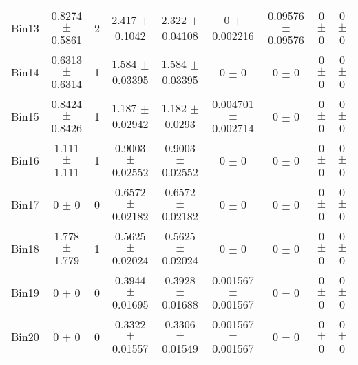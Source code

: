 \begin{tabular}{@{\extracolsep{4pt}}lcccccccc@{}}
     Bin13 & 0.8274 $\pm$ 0.5861 & 2 & 2.417 $\pm$ 0.1042 & 2.322 $\pm$ 0.04108 & 0 $\pm$ 0.002216 & 0.09576 $\pm$ 0.09576 & 0 $\pm$ 0 & 0 $\pm$ 0 \\ 
     Bin14 & 0.6313 $\pm$ 0.6314 & 1 & 1.584 $\pm$ 0.03395 & 1.584 $\pm$ 0.03395 & 0 $\pm$ 0 & 0 $\pm$ 0 & 0 $\pm$ 0 & 0 $\pm$ 0 \\ 
     Bin15 & 0.8424 $\pm$ 0.8426 & 1 & 1.187 $\pm$ 0.02942 & 1.182 $\pm$ 0.0293 & 0.004701 $\pm$ 0.002714 & 0 $\pm$ 0 & 0 $\pm$ 0 & 0 $\pm$ 0 \\ 
     Bin16 & 1.111 $\pm$ 1.111 & 1 & 0.9003 $\pm$ 0.02552 & 0.9003 $\pm$ 0.02552 & 0 $\pm$ 0 & 0 $\pm$ 0 & 0 $\pm$ 0 & 0 $\pm$ 0 \\ 
     Bin17 & 0 $\pm$ 0 & 0 & 0.6572 $\pm$ 0.02182 & 0.6572 $\pm$ 0.02182 & 0 $\pm$ 0 & 0 $\pm$ 0 & 0 $\pm$ 0 & 0 $\pm$ 0 \\ 
     Bin18 & 1.778 $\pm$ 1.779 & 1 & 0.5625 $\pm$ 0.02024 & 0.5625 $\pm$ 0.02024 & 0 $\pm$ 0 & 0 $\pm$ 0 & 0 $\pm$ 0 & 0 $\pm$ 0 \\ 
     Bin19 & 0 $\pm$ 0 & 0 & 0.3944 $\pm$ 0.01695 & 0.3928 $\pm$ 0.01688 & 0.001567 $\pm$ 0.001567 & 0 $\pm$ 0 & 0 $\pm$ 0 & 0 $\pm$ 0 \\ 
     Bin20 & 0 $\pm$ 0 & 0 & 0.3322 $\pm$ 0.01557 & 0.3306 $\pm$ 0.01549 & 0.001567 $\pm$ 0.001567 & 0 $\pm$ 0 & 0 $\pm$ 0 & 0 $\pm$ 0 \\ 
\hline\hline
  \end{tabular}
